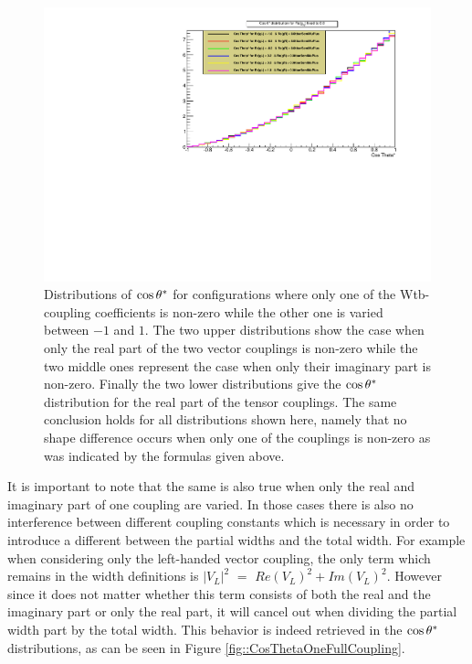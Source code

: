 \begin{figure}[h!]
 \includegraphics[width = 0.45 \textwidth]{Afbeeldingen/Chapter_LinkWithTopWidth/CosThetaResults/RgRvsRgL/RgLRgR_CosTheta_RgRFixedTo00.pdf}    %
 \caption{Distributions of $\cos \theta^{*}$ for configurations where only one of the Wtb-coupling coefficients is non-zero while the other one is varied between $-1$ and $1$. The two upper distributions show the case when only the real part of the two vector couplings is non-zero while the two middle ones represent the case when only their imaginary part is non-zero. Finally the two lower distributions give the $\cos \theta^{*}$ distribution for the real part of the tensor couplings. The same conclusion holds for all distributions shown here, namely that no shape difference occurs when only one of the couplings is non-zero as was indicated by the formulas given above.}
 \label{fig::CosThetaOneCoupling}
\end{figure}

It is important to note that the same is also true when only the real and imaginary part of one coupling are varied. In those cases there is also no interference between different coupling constants which is necessary in order to introduce a different between the partial widths and the total width. For example when considering only the left-handed vector coupling, the only term which remains in the width definitions is $\vert V_{L} \vert^{2}$ $=$ $Re(V_{L})^{2} + Im(V_{L})^{2}$. However since it does not matter whether this term consists of both the real and the imaginary part or only the real part, it will cancel out when dividing the partial width part by the total width. This behavior is indeed retrieved in the $\cos \theta^{*}$ distributions, as can be seen in Figure \ref{fig::CosThetaOneFullCoupling}.\\

